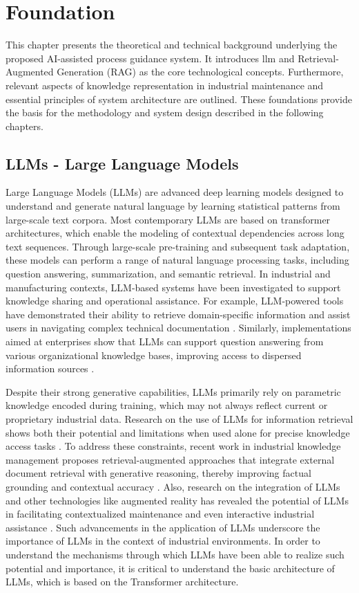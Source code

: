 \clearpage
\section{Foundation\label{sec:foundation}}

This chapter presents the theoretical and technical background underlying the proposed AI-assisted process guidance system. It introduces \gls{llm} and Retrieval-Augmented Generation (RAG) as the core technological concepts. Furthermore, relevant aspects of knowledge representation in industrial maintenance and essential principles of system architecture are outlined. These foundations provide the basis for the methodology and system design described in the following chapters.

\subsection{LLMs - Large Language Models\label{sec:LLM}}
Large Language Models (LLMs) are advanced deep learning models designed to understand and generate natural language by learning statistical patterns from large-scale text corpora. Most contemporary LLMs are based on transformer architectures, which enable the modeling of contextual dependencies across long text sequences. Through large-scale pre-training and subsequent task adaptation, these models can perform a range of natural language processing tasks, including question answering, summarization, and semantic retrieval. In industrial and manufacturing contexts, LLM-based systems have been investigated to support knowledge sharing and operational assistance. For example, LLM-powered tools have demonstrated their ability to retrieve domain-specific information and assist users in navigating complex technical documentation  \cite{freire_knowledge_2024}. Similarly, implementations aimed at enterprises show that LLMs can support question answering from various organizational knowledge bases, improving access to dispersed information sources \cite{sahin_llm_2024}.

Despite their strong generative capabilities, LLMs primarily rely on parametric knowledge encoded during training, which may not always reflect current or proprietary industrial data. Research on the use of LLMs for information retrieval shows both their potential and limitations when used alone for precise knowledge access tasks \cite{zhu_large_2026}.
To address these constraints, recent work in industrial knowledge management proposes retrieval-augmented approaches that integrate external document retrieval with generative reasoning, thereby improving factual grounding and contextual accuracy \cite{chen_application_2025}.
Also, research on the integration of LLMs and other technologies like augmented reality has revealed the potential of LLMs in facilitating contextualized maintenance and even interactive industrial assistance \cite{angelopoulos_industrial_2025}. Such advancements in the application of LLMs underscore the importance of LLMs in the context of industrial environments. In order to understand the mechanisms through which LLMs have been able to realize such potential and importance, it is critical to understand the basic architecture of LLMs, which is based on the Transformer architecture.
